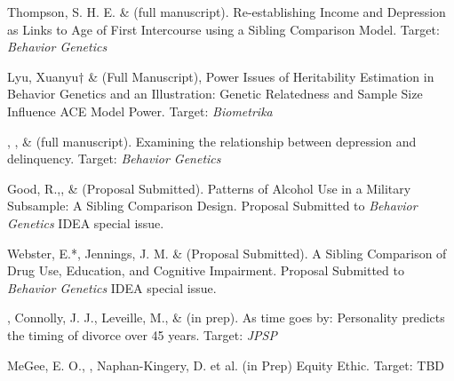 \item Thompson, S. H. E. \noteA \& \meb (full manuscript). Re-establishing Income and Depression as Links to Age of First Intercourse using a Sibling Comparison Model. Target: \textit{Behavior Genetics}
\item Lyu, Xuanyu$\dagger$ \&  \meb (Full Manuscript), Power Issues of Heritability Estimation in Behavior Genetics and an Illustration: Genetic Relatedness and Sample Size Influence ACE Model Power. Target: \textit{Biometrika}
\item \emsims, \jt, \& \meb (full manuscript). Examining the relationship between depression and delinquency. Target: \textit{Behavior Genetics}

\item Good, R.,\noteA \yrh, \&  \meb (Proposal Submitted). Patterns of Alcohol Use in a Military Subsample: A Sibling Comparison Design. Proposal Submitted to \textit{Behavior Genetics} IDEA special issue.
\item Webster, E.*, Jennings, J. M. \& \meb (Proposal Submitted). A Sibling Comparison of Drug Use, Education, and Cognitive Impairment. Proposal Submitted to \textit{Behavior Genetics} IDEA special issue.


%
\item \meb, Connolly, J. J., Leveille, M., \& \jjj (in prep). As time goes by: Personality predicts the timing of divorce over 45 years. Target: \textit{JPSP}
%

\item MeGee, E. O., \meb, Naphan-Kingery, D. et al. (in Prep) Equity Ethic. Target: TBD











